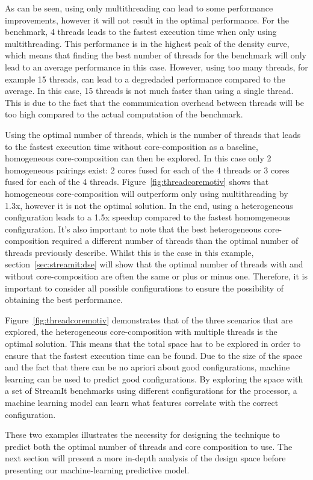 As can be seen, using only multithreading can lead to some performance improvements, however it will not result in the optimal performance.
For the  benchmark, 4 threads leads to the fastest execution time when only using multithreading.
This performance is in the highest peak of the density curve, which means that finding the best number of threads for the benchmark will only lead to an average performance in this case.
However, using too many threads, for example 15 threads, can lead to a degredaded performance compared to the average.
In this case, 15 threads is not much faster than using a single thread.
This is due to the fact that the communication overhead between threads will be too high compared to the actual computation of the benchmark.

Using the optimal number of threads, which is the number of threads that leads to the fastest execution time without core-composition as a baseline, homogeneous core-composition can then be explored.
In this case only 2 homogeneous pairings exist: 2 cores fused for each of the 4 threads or 3 cores fused for each of the 4 threads.
Figure~\ref{fig:threadcoremotiv} shows that homogeneous core-composition will outperform only using multithreading by 1.3x, however it is not the optimal solution.
In the end, using a heterogeneous configuration leads to a 1.5x speedup compared to the fastest homomgeneous configuration.
It's also important to note that the best heterogeneous core-composition required a different number of threads than the optimal number of threads previously describe.
Whilst this is the case in this example, section~\ref{sec:streamit:dse} will show that the optimal number of threads with and without core-composition are often the same or plus or minus one.
Therefore, it is important to consider all possible configurations to ensure the possibility of obtaining the best performance.

Figure~\ref{fig:threadcoremotiv} demonstrates that of the three scenarios that are explored, the heterogeneous core-composition with multiple threads is the optimal solution.
This means that the total space has to be explored in order to ensure that the fastest execution time can be found.
Due to the size of the space and the fact that there can be no apriori about good configurations, machine learning can be used to predict good configurations.
By exploring the space with a set of StreamIt benchmarks using different configurations for the processor, a machine learning model can learn what features correlate with the correct configuration.

These two examples illustrates the necessity for designing the technique to predict both the optimal number of threads and core composition to use.
The next section will present a more in-depth analysis of the design space before presenting our machine-learning predictive model.

